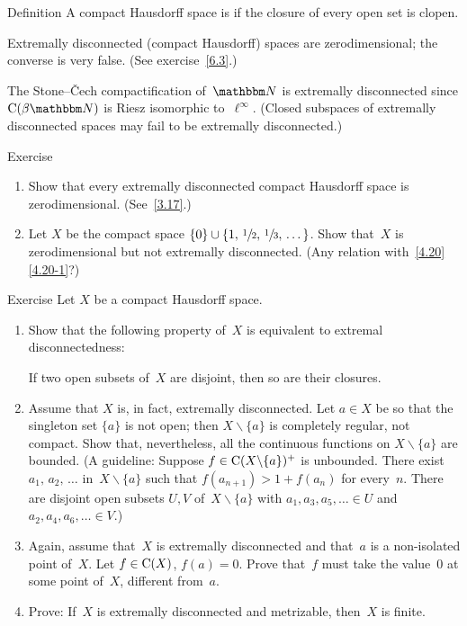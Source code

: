 \documentclass[main.tex]{subfiles}
\begin{document}
%
\begin{psec}{6.2}{Definition}
A compact Hausdorff space is
if the closure of every open set is clopen.

Extremally disconnected (compact Hausdorff) spaces are
zerodimensional;
the converse is very false.
(See exercise~\ref{6.3}.)

The Stone--\v{C}ech compactification of~$\N$
is extremally disconnected
since $\Cont{\beta\N}$ is Riesz isomorphic to~$\ell^\infty$.
(Closed subspaces of extremally disconnected spaces
may fail to be extremally disconnected.)
\end{psec}
%
%
\begin{psec}{6.3}{Exercise}
\begin{enumerate}
\item\label{6.3-1}
Show that every extremally disconnected
compact Hausdorff space is zerodimensional. (See~\ref{3.17}.)
%
\item\label{6.3-2}
Let $X$ be the compact space
$\{0\}\cup\{1,\,\sfrac{1}{2},\,\sfrac{1}{3},\,\dotsc\}$.
Show that~$X$ is zerodimensional
but not extremally disconnected.
(Any relation with~\ref{4.20}\ref{4.20-1}?)
\end{enumerate}
\end{psec}
%
%
\begin{psec}{6.4}{Exercise}
Let $X$ be a compact Hausdorff space.
\begin{enumerate}
\item\label{6.4-1}
Show that the following property of~$X$
is equivalent to extremal disconnectedness:
\vspace{.5em}
\begin{center}
\begin{minipage}{.45\textwidth}
If two open subsets of~$X$
are disjoint,
then so are their closures.
\end{minipage}
\end{center}
\vspace{.5em}
%
\item\label{6.4-2}
Assume that $X$ is, in fact, extremally disconnected.
Let $a\in X$ be so that the singleton set $\{a\}$ is not open;
then $X\backslash\{a\}$ is completely regular, not compact.
Show that, nevertheless,
all the continuous functions on $X\backslash\{a\}$ are bounded.
(A guideline:
Suppose $f\in\mathrm{C}(X\backslash\{a\})^+$ is unbounded.
There exist $a_1,\,a_2,\,\dotsc$ in~$X\backslash\{a\}$
such that $f(a_{n+1})>1+f(a_n)$ for every~$n$.
There are disjoint open subsets $U,V$ of~$X\backslash\{a\}$
with $a_1,a_3,a_5,\dotsc\in U$
and $a_2,a_4,a_6,\dotsc\in V$.)
%
\item\label{6.4-3}
Again, assume that~$X$ is extremally disconnected
and that~$a$ is a non-isolated point of~$X$.
Let $f\in\mathrm{C}(X)$, $f(a)=0$.
Prove that~$f$ must take the value~$0$ at some point of~$X$,
different from~$a$.
%
\item\label{6.4-4}
Prove:
If~$X$ is extremally disconnected
and metrizable,
then~$X$ is finite.
\end{enumerate}
\end{psec}
\end{document}
